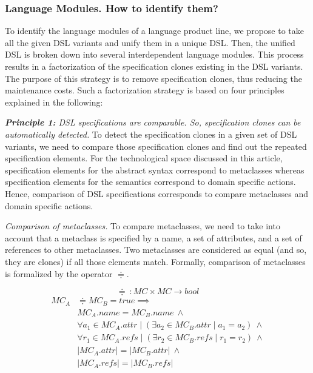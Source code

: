 \subsubsection{Language Modules. \textbf{How to identify them?}}

To identify the language modules of a language product line, we propose to take all the given DSL variants and unify them in a unique DSL. Then, the unified DSL is broken down into several interdependent language modules. This process results in a factorization of the specification clones existing in the DSL variants. The purpose of this strategy is to remove specification clones, thus reducing the maintenance costs. Such a factorization strategy is based on four principles explained in the following:

\vspace{2mm}
\emph{\textbf{Principle 1:} DSL specifications are comparable. So, specification clones can be automatically detected.} To detect the specification clones in a given set of DSL variants, we need to compare those specification clones and find out the repeated specification elements. For the technological space discussed in this article, specification elements for the abstract syntax correspond to metaclasses whereas specification elements for the semantics correspond to domain specific actions. Hence, comparison of DSL specifications corresponds to compare metaclasses and domain specific actions.

\vspace{2mm}
\emph{Comparison of metaclasses.} To compare metaclasses, we need to take into account that a metaclass is specified by a name, a set of attributes, and a set of references to other metaclasses. Two metaclasses are considered as equal (and so, they are clones) if all those elements match. Formally, comparison of metaclasses is formalized by the operator $\doteqdot$. %

\begin{equation}
  \doteqdot~: MC \times MC \rightarrow bool
\end{equation}
\begin{equation}
\begin{split}
  MC_{A} &\doteqdot MC_{B} = true \implies \\
   & MC_{A}.name = MC_{B}.name ~ \wedge \\
   & \forall a_1 \in MC_{A}.attr \mid (\exists a_2 \in MC_{B}.attr \mid a_1 = a_2) ~ \wedge \\
   & \forall r_1 \in MC_{A}.refs \mid (\exists r_2 \in MC_{B}.refs \mid r_1 = r_2) ~ \wedge \\
   & |MC_{A}.attr| = |MC_{B}.attr| ~ \wedge \\
   & |MC_{A}.refs| = |MC_{B}.refs|
  \end{split}
\end{equation}

